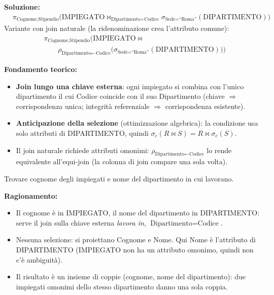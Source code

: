 \documentclass[12pt, a4paper]{article}
\begin{document}
\textbf{Soluzione:}
\begin{align*}
&\pi_{\text{Cognome},\text{Stipendio}}\Big(\text{IMPIEGATO}\bowtie_{\text{Dipartimento}=\text{Codice}}\sigma_{\text{Sede}=\text{``Roma''}}(\text{DIPARTIMENTO})\Big)
\end{align*}
Variante con join naturale (la ridenominazione crea l'attributo comune):
\begin{align*}
&\pi_{\text{Cognome},\text{Stipendio}}\Big(\text{IMPIEGATO}\bowtie\\
&\qquad\rho_{\text{Dipartimento}\leftarrow\text{Codice}}\big(\sigma_{\text{Sede}=\text{``Roma''}}(\text{DIPARTIMENTO})\big)\Big)
\end{align*}

\textbf{Fondamento teorico:}
\begin{itemize}
\item \textbf{Join lungo una chiave esterna}: ogni impiegato si combina con l'unico dipartimento il cui Codice coincide con il suo Dipartimento (chiave $\Rightarrow$ corrispondenza unica; integrità referenziale $\Rightarrow$ corrispondenza esistente).
\item \textbf{Anticipazione della selezione} (ottimizzazione algebrica): la condizione usa solo attributi di DIPARTIMENTO, quindi $\sigma_c(R\bowtie S)=R\bowtie\sigma_c(S)$.
\item Il join naturale richiede attributi omonimi: $\rho_{\text{Dipartimento}\leftarrow\text{Codice}}$ lo rende equivalente all'equi-join (la colonna di join compare una sola volta).
\end{itemize}

\begin{tcolorbox}[colback=lightergray!10, colframe=tocsec, title=\textbf{Esercizio 1.3}]
Trovare cognome degli impiegati e nome del dipartimento in cui lavorano.
\end{tcolorbox}

\textbf{Ragionamento:}
\begin{itemize}
\item Il cognome è in IMPIEGATO, il nome del dipartimento in DIPARTIMENTO: serve il join sulla chiave esterna \emph{lavora in}, $\text{Dipartimento}=\text{Codice}$.
\item Nessuna selezione: si proiettano Cognome e Nome. Qui Nome è l'attributo di DIPARTIMENTO (IMPIEGATO non ha un attributo omonimo, quindi non c'è ambiguità).
\item Il risultato è un insieme di coppie (cognome, nome del dipartimento): due impiegati omonimi dello stesso dipartimento danno una sola coppia.
\end{itemize}
\end{document}

